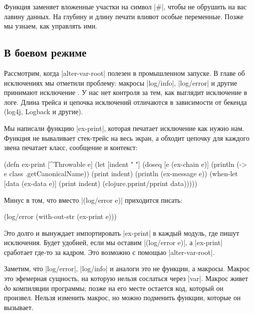 Функция заменяет вложенные участки на символ \spverb|#|, чтобы не обрушить на
вас лавину данных. На глубину и длину печати влияют особые переменные. Позже мы
узнаем, как управлять ими.

\subsection{В боевом режиме}

\label{install-logger}

Рассмотрим, когда \spverb|alter-var-root| полезен в промышленном запуске. В
главе об исключениях мы отметили проблему: макросы \spverb|log/info|,
\spverb|log/error| и другие принимают исключение . У нас нет
контроля за тем, как выглядит исключение в логе. Длина трейса и цепочка
исключений отличаются в зависимости от бекенда (log4j, Logback и другие).

Мы написали функцию \spverb|ex-print|, которая печатает исключение как нужно
нам. Функция не вываливает стек-трейс на весь экран, а обходит цепочку для
каждого звена печатает класс, сообщение и контекст:

\begin{english}
  \begin{clojure}
(defn ex-print
  [^Throwable e]
  (let [indent "  "]
    (doseq [e (ex-chain e)]
      (println (-> e class .getCanonicalName))
      (print indent)
      (println (ex-message e))
      (when-let [data (ex-data e)]
        (print indent)
        (clojure.pprint/pprint data)))))
  \end{clojure}
\end{english}

\noindent
Минус в том, что вместо \spverb|(log/error e)| приходится писать:

\begin{english}
  \begin{clojure}
(log/error (with-out-str (ex-print e)))
  \end{clojure}
\end{english}

Это долго и вынуждает импортировать \spverb|ex-print| в каждый модуль, где пишут
исключения. Будет удобней, если мы оставим \spverb|(log/error e)|, а
\spverb|ex-print| сработает где-то за кадром. Это возможно с помощью
\spverb|alter-var-root|.

Заметим, что \spverb|log/error|, \spverb|log/info| и аналоги это не функции, а
макросы. Макрос это эфемерная сущность, на которую нельзя сослаться через
\spverb|var|. Макрос живет \emph{до} компиляции программы; позже на его месте
остается код, который он произвел. Нельзя изменить макрос, но можно подменить
функции, которые он вызывает.

